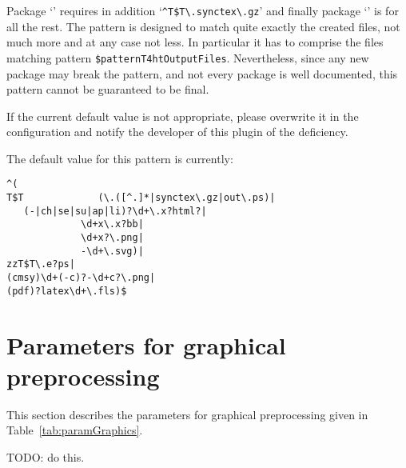 Package `' requires in addition 
`\texttt{\^{}T\$T\textbackslash.synctex\textbackslash.gz}' 
and finally package `' is for all the rest. 
The pattern is designed 
to match quite exactly the created files, 
not much more and at any case not less. 
In particular it has to comprise the files matching pattern 
\texttt{\$patternT4htOutputFiles}. 
Nevertheless, since any new package may break the pattern, 
and not every package is well documented, 
this pattern cannot be guaranteed to be final. 

If the current default value is not appropriate, 
please overwrite it in the configuration 
and notify the developer of this plugin of the deficiency. 

The default value for this pattern is currently: 
%
\begin{verbatim}
^(
T$T             (\.([^.]*|synctex\.gz|out\.ps)|
   (-|ch|se|su|ap|li)?\d+\.x?html?|
             \d+x\.x?bb|
             \d+x?\.png|
             -\d+\.svg)|
zzT$T\.e?ps|
(cmsy)\d+(-c)?-\d+c?\.png|
(pdf)?latex\d+\.fls)$
\end{verbatim}


\section{Parameters for graphical preprocessing}\label{sec:settingsGraph}

This section describes the parameters for graphical preprocessing 
given in Table~\ref{tab:paramGraphics}. 

TODO\@: do this. 


